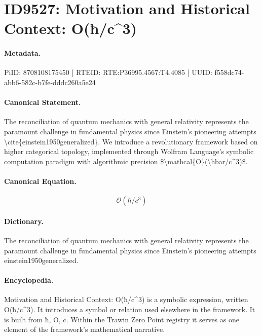 \section*{ID9527: Motivation and Historical Context: O(ħ/c\textasciicircum{}3)}
\paragraph{Metadata.}
PiID: 8708108175450 | RTEID: RTE:P36995.4567:T4.4085 | UUID: f558dc74-abb6-582c-b7fe-dddc260a5e24

\paragraph{Canonical Statement.}
The reconciliation of quantum mechanics with general relativity represents the paramount challenge in fundamental physics since Einstein's pioneering attempts \textbackslash{}cite\{einstein1950generalized\}. We introduce a revolutionary framework based on higher categorical topology, implemented through Wolfram Language's symbolic computation paradigm with algorithmic precision \$\textbackslash{}mathcal\{O\}(\textbackslash{}hbar/c\textasciicircum{}3)\$.

\paragraph{Canonical Equation.}
\[
\mathcal{O}(\hbar/c^3)
\]

\paragraph{Dictionary.}
The reconciliation of quantum mechanics with general relativity represents the paramount challenge in fundamental physics since Einstein's pioneering attempts einstein1950generalized.

\paragraph{Encyclopedia.}
Motivation and Historical Context: O(ħ/c\textasciicircum{}3) is a symbolic expression, written O(ħ/c\textasciicircum{}3). It introduces a symbol or relation used elsewhere in the framework. It is built from ħ, O, c. Within the Trawin Zero Point registry it serves as one element of the framework's mathematical narrative.
